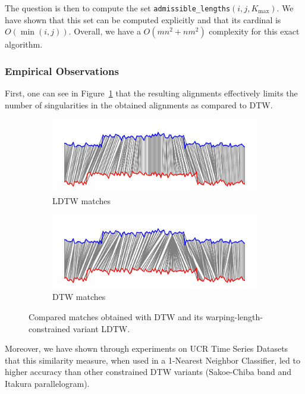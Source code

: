 The question is then to compute the set
\texttt{admissible\_lengths}$(i, j, K_\text{max})$.
We have shown that this set can be computed explicitly and that its cardinal
is $O(\min(i, j))$.
Overall, we have a $O(mn^2 + nm^2)$ complexity for this exact algorithm.

\subsubsection{Empirical Observations}

First, one can see in Figure~\ref{fig:ldtw} that the resulting alignments
effectively limits the number of singularities in the obtained alignments as
compared to DTW.

\begin{figure}[t]
    \begin{subfigure}[b]{\textwidth}
         \centering
         \includegraphics[width=\textwidth]{fig/dtw_warping_length}
         \caption{LDTW matches}
     \end{subfigure}
     \begin{subfigure}[b]{\textwidth}
          \centering
          \includegraphics[width=\textwidth]{fig/dtw_warping_length_b}
          \caption{DTW matches}
      \end{subfigure}
    \caption{Compared matches obtained with DTW and its
    warping-length-constrained variant LDTW.}
    \label{fig:ldtw}
\end{figure}

Moreover, we have shown through experiments on UCR Time Series Datasets that
this similarity measure, when used in a 1-Nearest Neighbor Classifier, led to
higher accuracy than other constrained DTW variants
(Sakoe-Chiba band and Itakura parallelogram).
